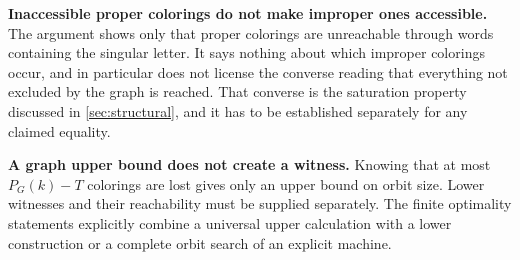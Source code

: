 \documentclass[11pt,a4paper]{article}
\numberwithin{equation}{section}
\theoremstyle{definition}
\theoremstyle{remark}
\begin{document}
\textbf{Inaccessible proper colorings do not make improper ones accessible.}
The argument shows only that proper colorings are unreachable through words
containing the singular letter. It says nothing about which improper
colorings occur, and in particular does not license the converse reading that
everything not excluded by the graph is reached. That converse is the
saturation property discussed in \cref{sec:structural}, and it has to be
established separately for any claimed equality.

\textbf{A graph upper bound does not create a witness.} Knowing that at most
$P_G(k)-T$ colorings are lost gives only an upper bound on orbit size. Lower
witnesses and their reachability must be supplied separately. The finite
optimality statements explicitly combine a universal upper calculation with
a lower construction or a complete orbit search of an explicit machine.
\end{document}
